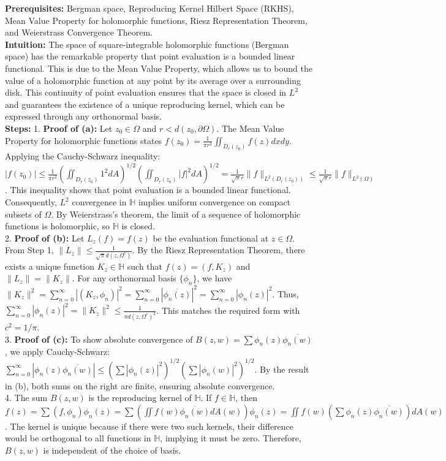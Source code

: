 \begin{solution}
\textbf{Prerequisites:} Bergman space, Reproducing Kernel Hilbert Space (RKHS), Mean Value Property for holomorphic functions, Riesz Representation Theorem, and Weierstrass Convergence Theorem. \\[1em]
\textbf{Intuition:} The space of square-integrable holomorphic functions (Bergman space) has the remarkable property that point evaluation is a bounded linear functional. This is due to the Mean Value Property, which allows us to bound the value of a holomorphic function at any point by its average over a surrounding disk. This continuity of point evaluation ensures that the space is closed in $L^2$ and guarantees the existence of a unique reproducing kernel, which can be expressed through any orthonormal basis. \\[1em]
\textbf{Steps:}
1. \textbf{Proof of (a):} Let $z_0 \in \Omega$ and $r < d(z_0, \partial\Omega)$. The Mean Value Property for holomorphic functions states $f(z_0) = \frac{1}{\pi r^2} \iint_{D_r(z_0)} f(z) dx dy$. 
Applying the Cauchy-Schwarz inequality:
$|f(z_0)| \leq \frac{1}{\pi r^2} \left( \iint_{D_r(z_0)} 1^2 dA \right)^{1/2} \left( \iint_{D_r(z_0)} |f|^2 dA \right)^{1/2} = \frac{1}{\sqrt{\pi} r} \|f\|_{L^2(D_r(z_0))} \leq \frac{1}{\sqrt{\pi} r} \|f\|_{L^2(\Omega)}$.
This inequality shows that point evaluation is a bounded linear functional. Consequently, $L^2$ convergence in $\mathbb{H}$ implies uniform convergence on compact subsets of $\Omega$. By Weierstrass's theorem, the limit of a sequence of holomorphic functions is holomorphic, so $\mathbb{H}$ is closed. \\[1em]
2. \textbf{Proof of (b):} Let $L_z(f) = f(z)$ be the evaluation functional at $z \in \Omega$. From Step 1, $\|L_z\| \leq \frac{1}{\sqrt{\pi} d(z, \Omega^c)}$.
By the Riesz Representation Theorem, there exists a unique function $K_z \in \mathbb{H}$ such that $f(z) = (f, K_z)$ and $\|L_z\| = \|K_z\|$.
For any orthonormal basis $\{\phi_n\}$, we have $\|K_z\|^2 = \sum_{n=0}^\infty |(K_z, \phi_n)|^2 = \sum_{n=0}^\infty |\overline{\phi_n(z)}|^2 = \sum_{n=0}^\infty |\phi_n(z)|^2$.
Thus, $\sum_{n=0}^\infty |\phi_n(z)|^2 = \|K_z\|^2 \leq \frac{1}{\pi d(z, \Omega^c)^2}$. This matches the required form with $c^2 = 1/\pi$. \\[1em]
3. \textbf{Proof of (c):} To show absolute convergence of $B(z,w) = \sum \phi_n(z) \overline{\phi_n(w)}$, we apply Cauchy-Schwarz:
$\sum_{n=0}^\infty |\phi_n(z) \overline{\phi_n(w)}| \leq \left( \sum |\phi_n(z)|^2 \right)^{1/2} \left( \sum |\phi_n(w)|^2 \right)^{1/2}$.
By the result in (b), both sums on the right are finite, ensuring absolute convergence. \\[1em]
4. The sum $B(z,w)$ is the reproducing kernel of $\mathbb{H}$. If $f \in \mathbb{H}$, then $f(z) = \sum (f, \phi_n) \phi_n(z) = \sum \left( \iint f(w) \overline{\phi_n(w)} dA(w) \right) \phi_n(z) = \iint f(w) \left( \sum \phi_n(z) \overline{\phi_n(w)} \right) dA(w)$.
The kernel is unique because if there were two such kernels, their difference would be orthogonal to all functions in $\mathbb{H}$, implying it must be zero. Therefore, $B(z,w)$ is independent of the choice of basis.
\end{solution}

